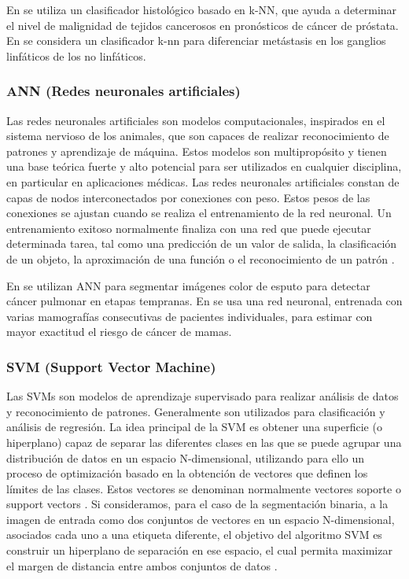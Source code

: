 En \citep{jafari2003multiwavelet} se utiliza un clasificador histológico basado en k-NN, que ayuda a determinar el nivel de malignidad de tejidos cancerosos en pronósticos de cáncer de próstata. En \citep{li2012using} se considera un clasificador k-nn para diferenciar metástasis en los ganglios linfáticos de los no linfáticos.

\subsubsection{ANN (Redes neuronales artificiales)}
Las redes neuronales artificiales son modelos computacionales, inspirados en el sistema nervioso de los animales, que son capaces de realizar reconocimiento de patrones y aprendizaje de máquina. Estos modelos son multipropósito y tienen una base teórica fuerte y alto potencial para ser utilizados en cualquier disciplina, en particular en aplicaciones médicas. Las redes neuronales artificiales constan de capas de nodos interconectados por conexiones con peso. Estos pesos de las conexiones se ajustan cuando se realiza el entrenamiento de la red neuronal. Un entrenamiento exitoso normalmente finaliza con una red que puede ejecutar determinada tarea, tal como una predicción de un valor de salida, la clasificación de un objeto, la aproximación de una función o el reconocimiento de un patrón \citep{dayhoff2001artificial}.

En \citep{taher2011lung} se utilizan ANN para segmentar imágenes color de esputo para detectar cáncer pulmonar en etapas tempranas. En \citep{ayer2010breast} se usa una red neuronal, entrenada con varias mamografías consecutivas de pacientes individuales, para estimar con mayor exactitud el riesgo de cáncer de mamas.

\subsubsection{SVM (Support Vector Machine)}
Las SVMs son modelos de aprendizaje supervisado para realizar análisis de datos y reconocimiento de patrones. Generalmente son utilizados para clasificación y análisis de regresión. La idea principal de la SVM es obtener una superficie (o hiperplano) capaz de separar las diferentes clases en las que se puede agrupar una distribución de datos en un espacio N-dimensional, utilizando para ello un proceso de optimización basado en la obtención de vectores que definen los límites de las clases. Estos vectores se denominan normalmente vectores soporte o support vectors \citep{cortes1995support}. Si consideramos, para el caso de la segmentación binaria, a la imagen de entrada como dos conjuntos de vectores en un espacio N-dimensional, asociados cada uno a una etiqueta diferente, el objetivo del algoritmo SVM es construir un hiperplano de separación en ese espacio, el cual permita maximizar el margen de distancia entre ambos conjuntos de datos \citep{scholkopf1999advances}.

